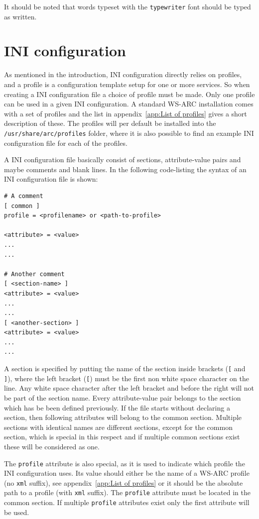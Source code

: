 \documentclass{article}
\begin{document}
It should be noted that words typeset with the \texttt{typewriter} font should
be typed as written.


\section{INI configuration}\label{sec:INI configuration}
As mentioned in the introduction, INI configuration directly relies on profiles,
and a profile is a configuration template setup for one or more services. So
when creating a INI configuration file a choice of profile must be made. Only
one profile can be used in a given INI configuration. A standard WS-ARC
installation comes with a set of profiles and the list in
appendix~\ref{app:List of profiles} gives a short description of these. The
profiles will per default be installed into the \texttt{/usr/share/arc/profiles}
folder, where it is also possible to find an example INI configuration file for
each of the profiles.

A INI configuration file basically consist of sections, attribute-value pairs
and maybe comments and blank lines. In the following code-listing the syntax of
an INI configuration file is shown:
\begin{lstlisting}
# A comment
[ common ]
profile = <profilename> or <path-to-profile>

<attribute> = <value>
...
...

# Another comment
[ <section-name> ]
<attribute> = <value>
...
...
[ <another-section> ]
<attribute> = <value>
...
...
\end{lstlisting}

A section is specified by putting the name of the section inside brackets
(\texttt{[} and \texttt{]}), where the left bracket (\texttt{[}) must be the
first non white space character on the line. Any white space character after the
left bracket and before the right will not be part of the section name. Every
attribute-value pair belongs to the section which has be been defined
previously. If the file starts without declaring a section, then following
attributes will belong to the common section. Multiple sections with identical
names are different sections, except for the common section, which is special in
this respect and if multiple common sections exist these will be considered as
one.

The \texttt{profile} attribute is also special, as it is used to indicate
which profile the INI configuration uses. Its value should either be the name of
a WS-ARC profile (no \texttt{xml} suffix), see
appendix~\ref{app:List of profiles} or it should be the absolute path to a
profile (with \texttt{xml} suffix). The \texttt{profile} attribute must be
located in the common section. If multiple \texttt{profile} attributes exist
only the first attribute will be used.
\end{document}
